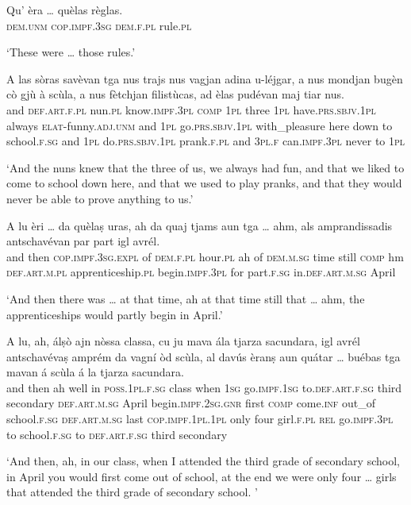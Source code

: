 \begin{linenumbers}
\gll    Qu’ èra … quèlas règlas.\\
 \textsc{dem.unm} \textsc{cop.impf.3sg} {} \textsc{dem.f.pl} rule.\textsc{pl}\\
\end{linenumbers}
\medskip
\glt `These were … those rules.'
\medskip

\begin{linenumbers}
\gll    A las sòras savèvan tga nus trajs nus vagjan adina u-léjgar, a nus mondjan bugèn cò gjù à scùla, a nus fètchjan filistùcas, ad èlas pudévan maj tiar nus.\\
and \textsc{def.art.f.pl} nun.\textsc{pl} know.\textsc{impf.3pl} \textsc{comp} \textsc{1pl} three \textsc{1pl} have.\textsc{prs.sbjv.1pl} always \textsc{elat}-funny.\textsc{adj.unm} and \textsc{1pl} go.\textsc{prs.sbjv.1pl} with\_pleasure here down to school.\textsc{f.sg} and \textsc{1pl} do.\textsc{prs.sbjv.1pl} prank.\textsc{f.pl} and \textsc{3pl.f} can.\textsc{impf.3pl} never to \textsc{1pl}\\
\end{linenumbers}
\medskip
\glt `And the nuns knew that the three of us, we always had fun, and that we liked to come to school down here, and that we used to play pranks, and that they would never be able to prove anything to us.'
\medskip

\begin{linenumbers}
\gll A lu èri … da quèlaṣ uras, ah da quaj tjams aun tga … ahm, als amprandissadis antschavévan par part igl avrél.\\
and then \textsc{cop.impf.3sg.expl} {} of \textsc{dem.f.pl} hour.\textsc{pl} ah of \textsc{dem.m.sg} time still  \textsc{comp} {} hm \textsc{def.art.m.pl} apprenticeship.\textsc{pl} begin.\textsc{impf.3pl} for part.\textsc{f.sg} in.\textsc{def.art.m.sg} April\\
\end{linenumbers}
\medskip
\glt `And then there was … at that time, ah at that time still that … ahm, the apprenticeships would partly begin in April.'
\medskip

\begin{linenumbers}
\gll A lu, ah, álṣò ajn nòssa classa, cu ju mava ála tjarza sacundara, igl avrél antschavévaṣ amprém da vagní òd scùla, al davús èranṣ aun quátar … buébas tga mavan á scùla á la tjarza sacundara.\\
and then ah well in \textsc{poss.1pl.f.sg} class when \textsc{1sg} go.\textsc{impf.1sg} to.\textsc{def.art.f.sg} third secondary \textsc{def.art.m.sg} April begin.\textsc{impf.2sg.gnr} first \textsc{comp} come.\textsc{inf} out\_of school.\textsc{f.sg} \textsc{def.art.m.sg} last \textsc{cop.impf.1pl.1pl}  only four {} girl.\textsc{f.pl} \textsc{rel} go.\textsc{impf.3pl} to school.\textsc{f.sg} to \textsc{def.art.f.sg} third secondary\\
\end{linenumbers}
\medskip
\glt `And then, ah, in our class, when I attended the third grade of secondary school, in April you would first come out of school, at the end we were only four … girls that attended the third grade of secondary school. '
\medskip

